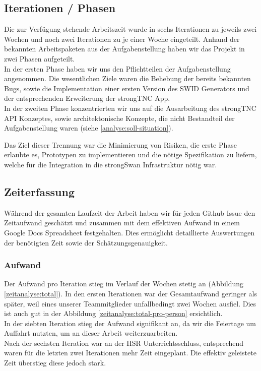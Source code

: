 \subsection{Iterationen / Phasen}

Die zur Verfügung stehende Arbeitszeit wurde in sechs Iterationen zu jeweils
zwei Wochen und noch zwei Iterationen zu je einer Woche eingeteilt. Anhand der
bekannten Arbeitspaketen aus der Aufgabenstellung haben wir das Projekt in zwei
Phasen aufgeteilt. \\ In der ersten Phase haben wir uns den Pflichtteilen der
Aufgabenstellung angenommen. Die wesentlichen Ziele waren die Behebung der
bereits bekannten Bugs, sowie die Implementation einer ersten Version des SWID
Generators und der entsprechenden Erweiterung der strongTNC App. \\ In der
zweiten Phase konzentrierten wir uns auf die Ausarbeitung des strongTNC API
Konzeptes, sowie architektonische Konzepte, die nicht Bestandteil der
Aufgabenstellung waren (siehe \autoref{analyse:soll-situation}).

Das Ziel dieser Trennung war die Minimierung von Risiken, die erste Phase
erlaubte es, Prototypen zu implementieren und die nötige Spezifikation zu
liefern, welche für die Integration in die strongSwan Infrastruktur nötig war.

\subsection{Zeiterfassung}

Während der gesamten Laufzeit der Arbeit haben wir für jeden Github Issue den
Zeitaufwand geschätzt und zusammen mit dem effektiven Aufwand in einem Google
Docs Spreadsheet festgehalten. Dies ermöglicht detaillierte Auswertungen der
benötigten Zeit sowie der Schätzungsgenauigkeit.

\subsubsection{Aufwand}

Der Aufwand pro Iteration stieg im Verlauf der Wochen stetig an (Abbildung
\ref{zeitanalyse:total}). In den ersten Iterationen war der Gesamtaufwand
geringer als später, weil eines unserer Teammitglieder unfallbedingt zwei Wochen
ausfiel. Dies ist auch gut in der Abbildung \ref{zeitanalyse:total-pro-person}
ersichtlich. \\
In der siebten Iteration stieg der Aufwand signifikant an, da wir die Feiertage
um Auffahrt nutzten, um an dieser Arbeit weiterzuarbeiten. \\
Nach der sechsten Iteration war an der HSR Unterrichtsschluss, entsprechend
waren für die letzten zwei Iterationen mehr Zeit eingeplant. Die effektiv
geleistete Zeit überstieg diese jedoch stark.

